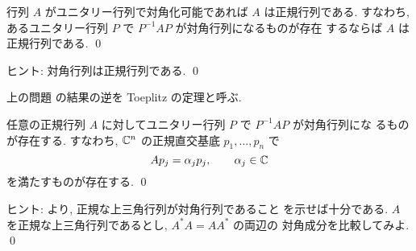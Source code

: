 \documentclass[12pt,twoside]{jarticle}
\begin{document}

\begin{question}[5点]
\label{q:Toeplitz-easy}
  行列 $A$ がユニタリー行列で対角化可能であれば $A$ は正規行列である. 
  すなわち, あるユニタリー行列 $P$ で $P^{-1}AP$ が対角行列になるものが存在
  するならば $A$ は正規行列である.
  \qed
\end{question}

\noindent
ヒント: 対角行列は正規行列である.
\qed

\medskip

上の問題  の結果の逆を Toeplitz の定理と呼ぶ.  


\begin{question}
\label{q:Toeplitz}
  任意の正規行列 $A$ に対してユニタリー行列 $P$ で $P^{-1}AP$ が対角行列にな 
  るものが存在する. すなわち, ${\mathbb C}^n$ の正規直交基底 $p_1,\dots,p_n$ で
  \begin{equation*}
    A p_j = \alpha_j p_j, \qquad \alpha_j \in {\mathbb C}
  \end{equation*}
  を満たすものが存在する. \qed
\end{question}

\noindent
ヒント:  より, 正規な上三角行列が対角行列であること
を示せば十分である.  $A$ を正規な上三角行列であるとし, $A^*A=AA^*$ の両辺の
対角成分を比較してみよ.
\qed

\end{document}
